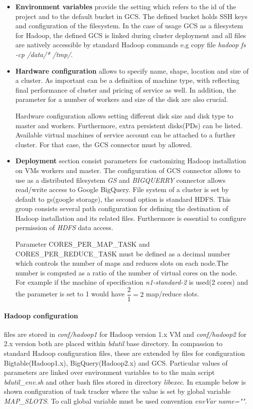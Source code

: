 \documentclass[a4paper,12pt,oneside]{report}
\begin{document}
\begin{itemize}
\item \textbf{Environment variables} provide the setting which refers to the id of the project and to 
the default bucket in GCS. The defined bucket holds SSH keys and configuration of the filesystem. In 
the case of usage GCS as a filesystem for Hadoop, the defined GCS is linked  during cluster deployment 
and all files are natively accessible by standard Hadoop commands e.g copy file \textit{hadoop fs -cp  /data/* /tmp/}.

\item \textbf{Hardware configuration}
allows to specify name, shape, location and size of a cluster. As important can be a definition of machine
 type, with reflecting final performance of cluster and pricing of service as well. In addition, the parameter 
 for a number of workers and size of the disk are also crucial.

Hardware configuration allows setting different disk size and  disk type to master and workers. Furthermore, 
extra persistent disks(PDs) can be listed. Available virtual machines of service account can be attached to a 
further cluster. For that case, the GCS connector must by allowed.

\item \textbf{Deployment} section consist parameters for customizing Hadoop installation on VMs workers 
and master. The configuration of GCS connector allows to use as a distributed filesystem \textit{GS} and 
\textit{BIGQUERRY} connector allows read/write access to Google BigQuery. File system of a cluster is set 
by default to gs(google storage), the second 
option is standard HDFS. This group consists several path configuration for defining the destination of 
Hadoop installation and its related files. Furthermore is essential to configure permission  of \textit{HDFS} data access.

Parameter CORES\_PER\_MAP\_TASK and CORES\_PER\_REDUCE\_TASK must be defined as a decimal number which 
controls the number of maps and reduces slots on each node.The number is computed as a ratio of the 
number of virtual cores on the node. For example if the machine of specification \textit{ n1-standard-2} 
is used(2 cores) and the parameter is set to 1 would have $\dfrac{2}{1} = 2$ map/reduce slots.
\end{itemize}


\paragraph{Hadoop configuration} files  are stored in \textit{conf/hadoop1} for Hadoop version 1.x VM and 
\textit{conf/hadoop2} for 2.x version both are placed within \textit{bdutil} base directory. In compassion 
to standard Hadoop configuration files, these are extended by files for configuration Bigtable(Hadoop1.x), 
BigQuery(Hadoop2.x) and GCS. Particular values of parameters are linked over environment variables to  to 
the main script \textit{bdutil\_env.sh} and other bash files stored in directory \textit{libexec}. In 
example below is shown configuration of task tracker where the value is set by global variable 
\textit{MAP\_SLOTS}. To call global variable must be used convention \textit{envVar name=""}.
\end{document}
